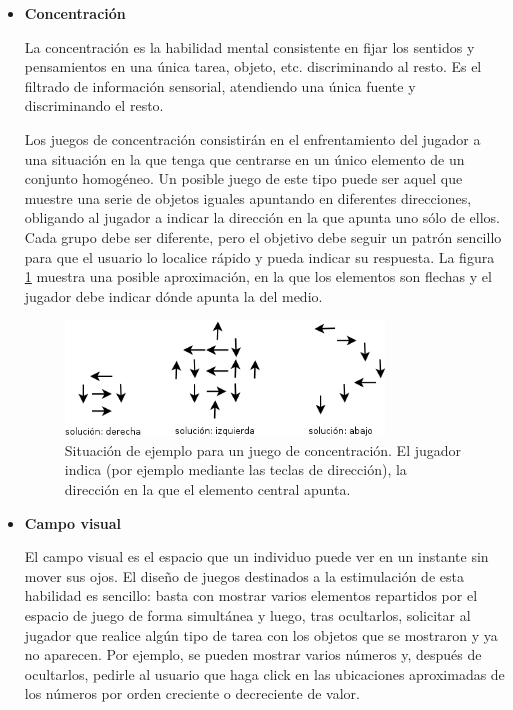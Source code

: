 \begin{itemize}

\item {\bf Concentración}

La concentración es la habilidad mental consistente en fijar los sentidos y pensamientos en una única tarea, objeto, etc. discriminando al resto. Es el filtrado de información sensorial, atendiendo una única fuente y discriminando el resto.

Los juegos de concentración consistirán en el enfrentamiento del jugador a una situación en la que tenga que centrarse en un único elemento de un conjunto homogéneo. Un posible juego de este tipo puede ser aquel que muestre una serie de objetos iguales apuntando en diferentes direcciones, obligando al jugador a indicar la dirección en la que apunta uno sólo de ellos. Cada grupo debe ser diferente, pero el objetivo debe seguir un patrón sencillo para que el usuario lo localice rápido y pueda indicar su respuesta. La figura \ref{fig::game-focus} muestra una posible aproximación, en la que los elementos son flechas y el jugador debe indicar dónde apunta la del medio.

\begin{figure}[h]
  \begin{center}
    \includegraphics[width=0.8\textwidth]{./images/game-focus.png}
    \caption[Juego de concentración]{Situación de ejemplo para un juego de concentración. El jugador indica (por ejemplo mediante las teclas de dirección), la dirección en la que el elemento central apunta.}
    \label{fig::game-focus}
  \end{center}  
\end{figure}

\item {\bf Campo visual}

El campo visual es el espacio que un individuo puede ver en un instante sin mover sus ojos. El diseño de juegos destinados a la estimulación de esta habilidad es sencillo: basta con mostrar varios elementos repartidos por el espacio de juego de forma simultánea y luego, tras ocultarlos, solicitar al jugador que realice algún tipo de tarea con los objetos que se mostraron y ya no aparecen. Por ejemplo, se pueden mostrar varios números y, después de ocultarlos, pedirle al usuario que haga click en las ubicaciones aproximadas de los números por orden creciente o decreciente de valor.

\end{itemize}

